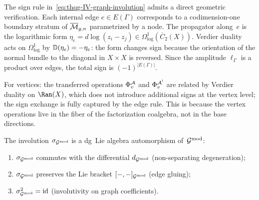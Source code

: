 \begin{remark}
\label{rem:thqg-IV-sign-accounting}
The sign rule in~\eqref{eq:thqg-IV-graph-involution} admits a direct
geometric verification. Each internal edge $e \in E(\Gamma)$
corresponds to a codimension-one boundary stratum of $\overline{\mathcal{M}}_{g,n}$
parametrized by a node. The propagator along~$e$ is the logarithmic
form $\eta_e = d\log(z_i - z_j) \in \Omega^1_{\log}(\overline{C}_2(X))$.
Verdier duality acts on $\Omega^1_{\log}$ by
$\mathbb{D}(\eta_e) = -\eta_e$: the form changes sign because the orientation
of the normal bundle to the diagonal in $X \times X$ is reversed.
Since the amplitude $\ell_\Gamma$ is a product over edges, the total
sign is $(-1)^{|E(\Gamma)|}$.

For vertices: the transferred operations $\Phi_v^{\mathcal{A}}$ and $\Phi_v^{\mathcal{A}^!}$
are related by Verdier duality on $\Ran(X)$, which does not introduce
additional signs at the vertex level; the sign exchange is fully
captured by the edge rule. This is because the vertex operations live in
the fiber of the factorization coalgebra, not in the base directions.
\end{remark}

\begin{lemma}
\label{lem:thqg-IV-verdier-graph-composition}
The involution $\sigma_{\mathcal{G}^{\mathrm{mod}}}$ is a dg~Lie algebra automorphism
of~$\mathcal{G}^{\mathrm{mod}}$:
\begin{enumerate}[label=\textup{(\alph*)}]
\item $\sigma_{\mathcal{G}^{\mathrm{mod}}}$ commutes with the differential
 $d_{\mathcal{G}^{\mathrm{mod}}}$ (non-separating degeneration);
\item $\sigma_{\mathcal{G}^{\mathrm{mod}}}$ preserves the Lie bracket
 $[-,-]_{\mathcal{G}^{\mathrm{mod}}}$ (edge gluing);
\item $\sigma_{\mathcal{G}^{\mathrm{mod}}}^2 = \mathrm{id}$ (involutivity on graph coefficients).
\end{enumerate}
\end{lemma}


